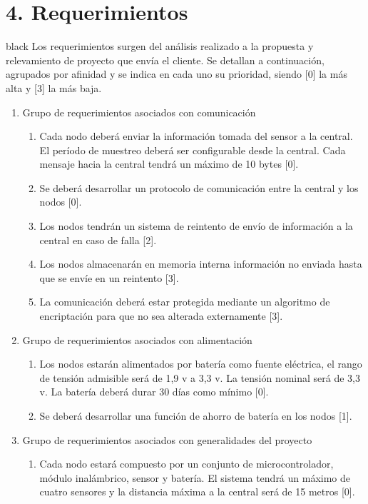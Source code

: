 \documentclass[11pt]{charter}
\begin{document}
\section{4. Requerimientos}
\label{sec:requerimientos}

\begin{consigna}{black}
Los requerimientos surgen del análisis realizado a la propuesta y relevamiento de proyecto que envía el cliente. Se detallan a continuación, agrupados por afinidad y se indica en cada uno su prioridad, siendo [0] la más alta y [3] la más baja.

\begin{enumerate}
\item Grupo de requerimientos asociados con comunicación
	\begin{enumerate}
	\item Cada nodo deberá enviar la información tomada del sensor a la central. El período de muestreo deberá ser configurable desde la central. Cada mensaje hacia la central tendrá un máximo de 10 bytes [0].
	\item Se deberá desarrollar un protocolo de comunicación entre la central y los nodos [0].
	\item Los nodos tendrán un sistema de reintento de envío de información a la central en caso de falla [2].
	\item Los nodos almacenarán en memoria interna información no enviada hasta que se envíe en un reintento [3].
	\item La comunicación deberá estar protegida mediante un algoritmo de encriptación para que no sea alterada externamente [3].
	\end{enumerate}
\item Grupo de requerimientos asociados con alimentación
	\begin{enumerate}
	\item Los nodos estarán alimentados por batería como fuente eléctrica, el rango de tensión admisible será de 1,9 v a 3,3 v. La tensión nominal será de 3,3 v. La batería deberá durar 30 días como mínimo [0].
	\item Se deberá desarrollar una función de ahorro de batería en los nodos [1].
	\end{enumerate}
\item Grupo de requerimientos asociados con generalidades del proyecto
	\begin{enumerate}
	\item Cada nodo estará compuesto por un conjunto de microcontrolador, módulo inalámbrico, sensor y batería. El sistema tendrá un máximo de cuatro sensores y la distancia máxima a la central será de 15 metros [0].

\end{enumerate}
\end{enumerate}
\end{consigna}
\end{document}
